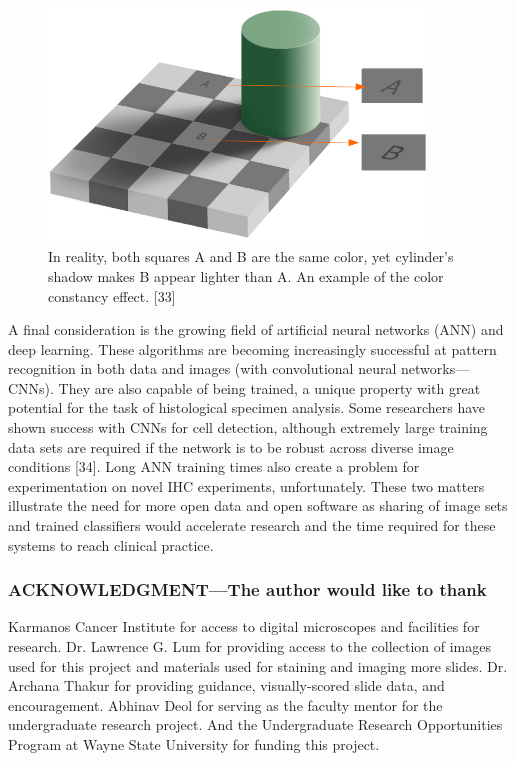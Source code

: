 \documentclass[12pt]{article}
\begin{document}
\begin{figure}[H]
  \centerline{\includegraphics[width=10cm]{13ColorConstancyIllusion.png}}
  \caption{In reality, both squares A and B are the same color, yet
cylinder’s shadow makes B appear lighter than A. An
example of the color constancy effect. [33]}
  \label{fig:Color Constancy Illusion}
\end{figure}


A final consideration is the growing field of artificial neural networks (ANN) and deep learning.
These algorithms are becoming increasingly successful at pattern recognition in both data and images
(with convolutional neural networks---CNNs). They are also capable of being trained, a unique
property with great potential for the task of histological specimen analysis. Some researchers have
shown success with CNNs for cell detection, although extremely large training data sets are required if
the network is to be robust across diverse image conditions [34]. Long ANN training times also create a
problem for experimentation on novel IHC experiments, unfortunately. These two matters illustrate the
need for more open data and open software as sharing of image sets and trained classifiers would
accelerate research and the time required for these systems to reach clinical practice.

\newpage
\subsubsection*{ACKNOWLEDGMENT---The author would like to thank}

Karmanos Cancer Institute for access to digital microscopes and facilities for research. Dr. Lawrence
G. Lum for providing access to the collection of images used for this project and materials used for
staining and imaging more slides. Dr. Archana Thakur for providing guidance, visually-scored slide
data, and encouragement. Abhinav Deol for serving as the faculty mentor for the undergraduate
research project. And the Undergraduate Research Opportunities Program at Wayne State University for funding this project.
\end{document}
